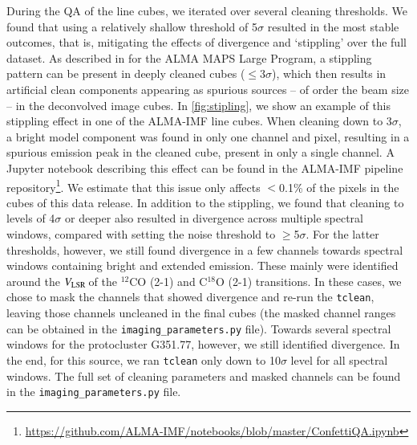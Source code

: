 \documentclass[longauth]{aa} %
\newcommand{\vlsr}{\mbox{$V_{\rm LSR}$\,}}
\newcommand\tclean{\texttt{tclean}\xspace}
\begin{document}
During the QA of the line cubes, we iterated over several cleaning thresholds. We found that using a relatively shallow threshold of 5$\sigma$ resulted in the most stable outcomes, that is, mitigating the effects of divergence and `stippling' over the full dataset. As described in \citet{Czekala2021} for the ALMA MAPS Large Program, a stippling pattern can be present in deeply cleaned cubes ($\leq3\sigma$), which then results in artificial clean components appearing as spurious sources -- of order the beam size -- in the deconvolved image cubes. In \cref{fig:stipling}, we show an example of this  stippling effect in one of the ALMA-IMF line cubes. When cleaning down to 3$\sigma$, a bright model component was found in only one channel and pixel, resulting in a spurious emission peak in the cleaned cube, present in only a single channel. A Jupyter notebook describing this effect can be found in the ALMA-IMF pipeline repository\footnote{\url{https://github.com/ALMA-IMF/notebooks/blob/master/ConfettiQA.ipynb}}. We estimate that this  issue only affects $<$0.1\% of the pixels in the cubes of this data release. In addition to the stippling, we found that cleaning to levels of 4$\sigma$ or deeper also resulted in divergence across multiple spectral windows, compared with setting the noise threshold to $\geq$5$\sigma$. For the latter thresholds, however, we still found divergence in a few channels towards spectral windows containing bright and extended emission. These mainly were identified around the \vlsr of the $^{12}$CO (2-1) and C$^{18}$O (2-1) transitions. In these cases, we chose to mask the channels that showed divergence and re-run the \tclean, leaving those channels uncleaned in the final cubes (the masked channel ranges can be obtained in the \texttt{imaging\_parameters.py} file). Towards several spectral windows for the protocluster G351.77, however, we still identified divergence. In the end, for this source, we ran \tclean only down to 10$\sigma$ level for all spectral windows. The full set of cleaning parameters and masked channels can be found in the \texttt{imaging\_parameters.py} file. 
\end{document}
